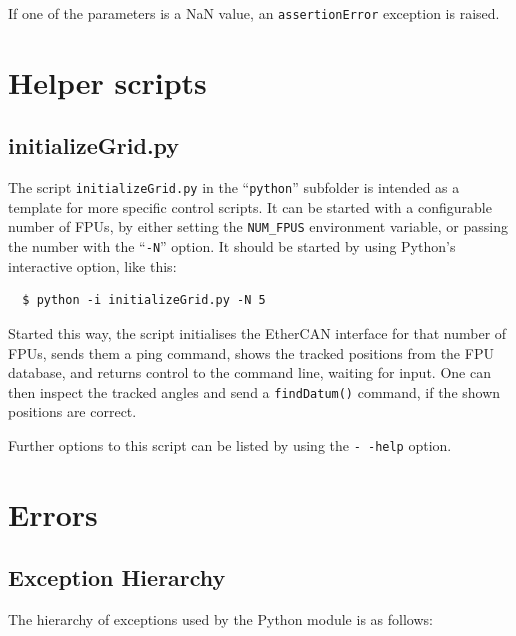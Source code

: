 \documentclass[fontsize=12,a4paper]{scrreprt}
\begin{document}
If one of the parameters is a NaN value, an \texttt{assertionError}
exception is raised.

\chapter{Helper scripts}

\section{initializeGrid.py}
\label{sec:initializegrid}

The script \texttt{initializeGrid.py} in the ``\texttt{python}''
subfolder is intended as a template for more specific control scripts.
It can be started with a configurable number of FPUs, by either
setting the \texttt{NUM\_FPUS} environment variable, or passing the
number with the ``\texttt{-N}'' option. It should be started by using
Python's interactive option, like this:

\begin{verbatim}
  $ python -i initializeGrid.py -N 5
\end{verbatim}

Started this way, the script initialises the EtherCAN interface for that number of
FPUs, sends them a ping command, shows the tracked positions from the
FPU database, and returns control to the command line, waiting for
input. One can then inspect the tracked angles and send a
\texttt{findDatum()} command, if the shown positions are correct.

Further options to this script can be listed by using the
\texttt{-\,-help} option.


\chapter{Errors}
\label{sec:errors}

\section{Exception Hierarchy}
\label{sec:ExceptionsReference}
The hierarchy of exceptions used by the Python module is as follows:
\end{document}
